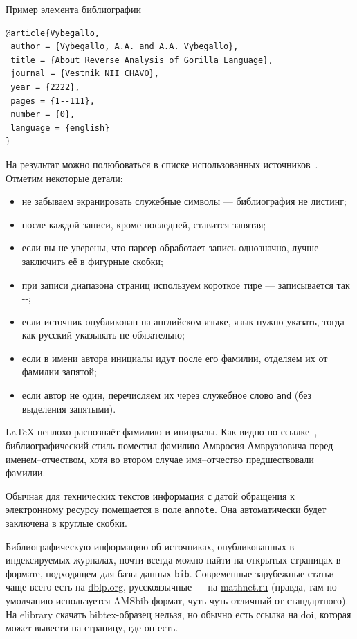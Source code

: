 \documentclass[14pt, russian]{scrartcl}
\begin{document}
\begin{listing}[!htb]
\caption{Пример элемента библиографии}
\begin{verbatim}
@article{Vybegallo,
 author = {Vybegallo, A.A. and A.A. Vybegallo},
 title = {About Reverse Analysis of Gorilla Language},
 journal = {Vestnik NII CHAVO},
 year = {2222},
 pages = {1--111},
 number = {0},
 language = {english}
}
\end{verbatim}
\label{lst:bib}
\end{listing}

На результат можно полюбоваться в списке использованных источников~\cite{Vybegallo}. 
Отметим некоторые детали:
\begin{itemize}
\item не забываем экранировать служебные символы --- библиография не листинг;
\item после каждой записи, кроме последней, ставится запятая;
\item если вы не уверены, что парсер обработает запись однозначно, лучше заключить её в фигурные скобки;
\item при записи диапазона страниц используем короткое тире --- записывается так -{}-;
\item если источник опубликован на английском языке, язык нужно указать, тогда как русский указывать не обязательно;
\item если в имени автора инициалы идут после его фамилии, отделяем их от фамилии запятой;
\item если автор не один, перечисляем их через служебное слово \texttt{and} (без выделения запятыми). 
\end{itemize}

\LaTeX{} неплохо распознаёт фамилию и инициалы. Как видно по ссылке~\cite{Vybegallo}, библиографический стиль поместил фамилию Амвросия Амвруазовича перед именем--отчеством, хотя во втором случае имя--отчество предшествовали фамилии. 

Обычная для технических текстов информация с датой обращения к электронному ресурсу помещается в поле \texttt{annote}. Она автоматически будет заключена в круглые скобки. 

Библиографическую информацию об источниках, опубликованных в индексируемых журналах, почти всегда можно найти на открытых страницах в формате, подходящем для базы данных \texttt{bib}. Современные зарубежные статьи чаще всего есть на \url{dblp.org}, русскоязычные --- на \url{mathnet.ru} (правда, там по умолчанию используется AMSbib-формат, чуть-чуть отличный от стандартного). На elibrary скачать bibtex-образец нельзя, но обычно есть ссылка на doi, которая может вывести на страницу, где он есть.
\end{document}
